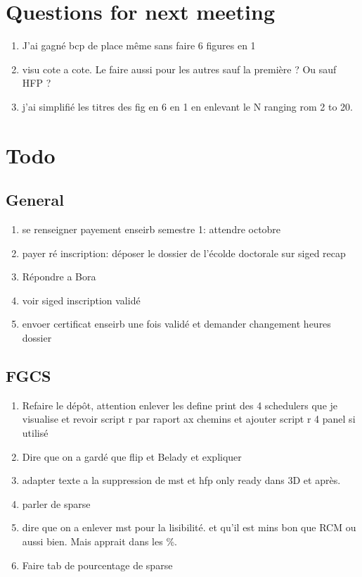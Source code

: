 \documentclass[a4paper]{article}
\begin{document}
\section{Questions for next meeting}
	\begin{enumerate}
		\item J'ai gagné bcp de place même sans faire 6 figures en 1
		\item visu cote a cote. Le faire aussi pour les autres sauf la première ? Ou sauf HFP ?
		\item j'ai simplifié les titres des fig en 6 en 1 en enlevant le N ranging rom 2 to 20.
	\end{enumerate}
	
\section{Todo}
	\subsection{General}
		\begin{enumerate}
			\item se renseigner payement enseirb semestre 1: attendre octobre
			\item payer ré inscription: déposer le dossier de l'écolde doctorale sur siged recap
			\item Répondre a Bora
			\item voir siged inscription validé
			\item envoer certificat enseirb une fois validé et demander changement heures dossier
		\end{enumerate}
	\subsection{FGCS}
		\begin{enumerate}
			\item Refaire le dépôt, attention enlever les define print des 4 schedulers que je visualise et revoir script r par raport ax chemins et ajouter script r 4 panel si utilisé
			\item Dire que on a gardé que flip et Belady et expliquer
			\item adapter texte a la suppression de mst et hfp only ready dans 3D et après.
			\item parler de sparse
			\item dire que on a enlever mst pour la lisibilité. et qu'il est mins bon que RCM ou aussi bien. Mais apprait dans les \%.
			\item Faire tab de pourcentage de sparse
		\end{enumerate}
\end{document}
